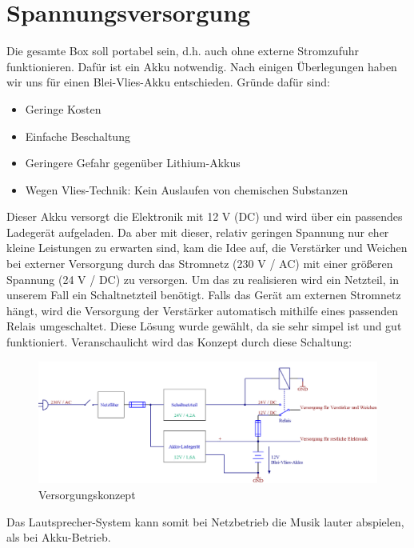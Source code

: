 \section{Spannungsversorgung}\label{sec:3.4}
Die gesamte Box soll portabel sein, d.h. auch ohne externe Stromzufuhr funktionieren.
Dafür ist ein Akku notwendig.
Nach einigen Überlegungen haben wir uns für einen Blei-Vlies-Akku entschieden.
Gründe dafür sind:
\begin{itemize}
	\item Geringe Kosten
	\item Einfache Beschaltung
	\item Geringere Gefahr gegenüber Lithium-Akkus
	\item Wegen Vlies-Technik: Kein Auslaufen von chemischen Substanzen
\end{itemize}
Dieser Akku versorgt die Elektronik mit 12 V (DC) und wird über ein passendes Ladegerät aufgeladen.
Da aber mit dieser, relativ geringen Spannung nur eher kleine Leistungen zu erwarten sind, kam die Idee auf, die Verstärker und Weichen bei externer Versorgung durch das Stromnetz (230 V / AC) mit einer größeren Spannung (24 V / DC) zu versorgen.
Um das zu realisieren wird ein Netzteil, in unserem Fall ein Schaltnetzteil benötigt.
Falls das Gerät am externen Stromnetz hängt, wird die Versorgung der Verstärker automatisch mithilfe eines passenden Relais umgeschaltet.
Diese Lösung wurde gewählt, da sie sehr simpel ist und gut funktioniert.
Veranschaulicht wird das Konzept durch diese Schaltung:
\begin{figure} [H]
	\centering	
	\includegraphics[width=1\textwidth]{img/Grundlagen/VersorgungV2.png}
	\caption{Versorgungskonzept}
	\label {fig:3.4.1}
\end{figure}
Das Lautsprecher-System kann somit bei Netzbetrieb die Musik lauter abspielen, als bei Akku-Betrieb.

